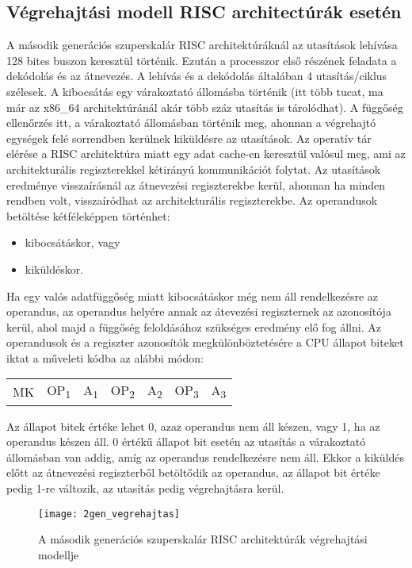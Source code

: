 \subsection{Végrehajtási modell RISC architectúrák esetén}
A második generációs szuperskalár RISC architektúráknál az utasítások lehívása 128 bites buszon keresztül történik.
Ezután a processzor első részének feladata a dekódolás és az átnevezés.
A lehívás és a dekódolás általában 4 utasítás/ciklus szélesek.
A kibocsátás egy várakoztató állomásba történik (itt több tucat, ma már az x86\_64 architektúránál akár több száz utasítás is tárolódhat).
A függőség ellenőrzés itt, a várakoztató állomásban történik meg, ahonnan a végrehajtó egységek felé sorrendben kerülnek kiküldésre az utasítások.
Az operatív tár elérése a RISC architektúra miatt egy adat cache-en keresztül valósul meg, ami az architekturális regiszterekkel kétirányú kommunikációt folytat.
Az utasítások eredménye visszaírásnál az átnevezési regiszterekbe kerül, ahonnan ha minden rendben volt, visszaíródhat az architekturális regiszterekbe.
Az operandusok betöltése kétféleképpen történhet:
\begin{itemize}
    \item kibocsátáskor, vagy
    \item kiküldéskor.
\end{itemize}
Ha egy valós adatfüggőség miatt kibocsátáskor még nem áll rendelkezésre az operandus, az operandus helyére annak az átevezési regiszternek az azonosítója kerül, ahol majd a függőség feloldásához szükséges eredmény elő fog állni.
Az operandusok és a regiszter azonosítók megkülönböztetésére a CPU állapot biteket iktat a műveleti kódba az alábbi módon:
\begin{center}
    \begin{tabular}{ c | c | c | c | c | c | c }
        MK & OP\textsubscript{1} & A\textsubscript{1} & OP\textsubscript{2} & A\textsubscript{2} & OP\textsubscript{3} & A\textsubscript{3}
    \end{tabular}
\end{center}
Az állapot bitek értéke lehet 0, azaz operandus nem áll készen, vagy 1, ha az operandus készen áll.
0 értékű állapot bit esetén az utasítás a várakoztató állomásban van addig, amíg az operandus rendelkezésre nem áll.
Ekkor a kiküldés előtt az átnevezési regiszterből betöltődik az operandus, az állapot bit értéke pedig 1-re változik, az utasítás pedig végrehajtásra kerül.
\begin{figure}[h]
    \texttt{[image: 2gen\_vegrehajtas]}
    \centering
    \caption{A második generációs szuperskalár RISC architektúrák végrehajtási modellje}
    \label{fig:2gen_vegrehajtas}
\end{figure}

